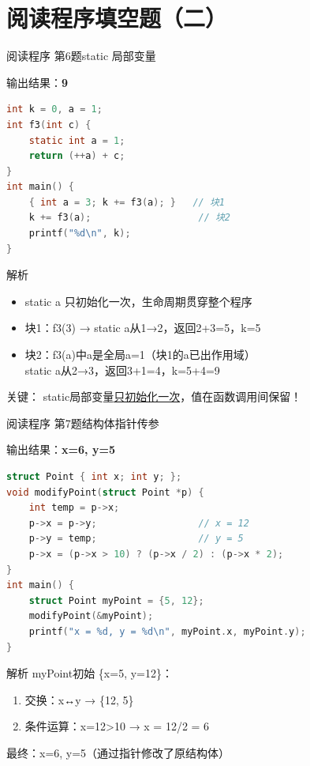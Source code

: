 \section{阅读程序填空题（二）}

\begin{frame}[fragile]{阅读程序 第6题}{static 局部变量}
    \begin{exampleblock}{输出结果：\textbf{9}}
    \end{exampleblock}
    \begin{lstlisting}[language=C]
int k = 0, a = 1;
int f3(int c) {
    static int a = 1;
    return (++a) + c;
}
int main() {
    { int a = 3; k += f3(a); }   // 块1
    k += f3(a);                   // 块2
    printf("%d\n", k);
}
\end{lstlisting}
    \pause
    \begin{alertblock}{解析}
        \footnotesize
        \begin{itemize}
            \setlength{\itemsep}{0pt}
            \item static a 只初始化一次，生命周期贯穿整个程序
            \item 块1：f3(3) → static a从1→2，返回2+3=5，k=5
            \item 块2：f3(a)中a是全局a=1（块1的a已出作用域）\\
            static a从2→3，返回3+1=4，k=5+4=9
        \end{itemize}
        {\color{highlight}关键：} static局部变量\underline{只初始化一次}，值在函数调用间保留！
    \end{alertblock}
\end{frame}

\begin{frame}[fragile]{阅读程序 第7题}{结构体指针传参}
    \begin{exampleblock}{输出结果：\textbf{x=6, y=5}}
    \end{exampleblock}
    \begin{lstlisting}[language=C]
struct Point { int x; int y; };
void modifyPoint(struct Point *p) {
    int temp = p->x;
    p->x = p->y;                  // x = 12
    p->y = temp;                  // y = 5
    p->x = (p->x > 10) ? (p->x / 2) : (p->x * 2);
}
int main() {
    struct Point myPoint = {5, 12};
    modifyPoint(&myPoint);
    printf("x = %d, y = %d\n", myPoint.x, myPoint.y);
}
\end{lstlisting}
    \pause
    \begin{alertblock}{解析}
        \footnotesize myPoint初始 \{x=5, y=12\}：
        \begin{enumerate}
            \setlength{\itemsep}{0pt}
            \item 交换：x↔y → \{12, 5\}
            \item 条件运算：x=12>10 → x = 12/2 = 6
        \end{enumerate}
        最终：x=6, y=5（通过指针修改了原结构体）
    \end{alertblock}
\end{frame}

